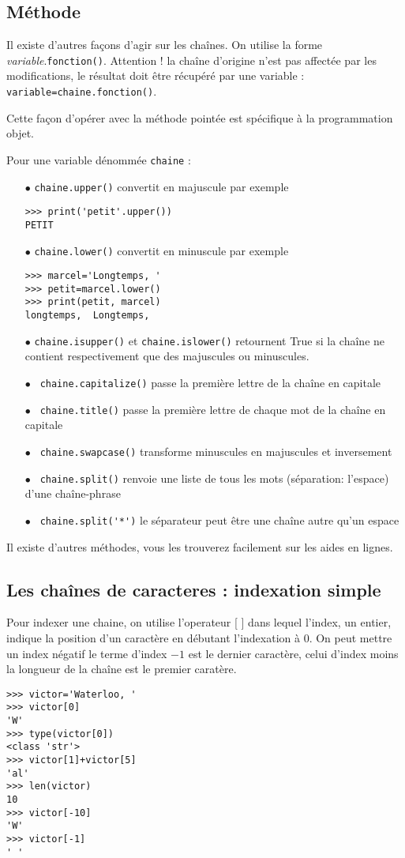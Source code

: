 \subsection{Méthode}
Il existe d'autres façons d'agir sur les chaînes. On  utilise la forme \emph{variable}.\lstinline?fonction()?. Attention ! la chaîne d'origine n'est pas affectée par les modifications, le résultat doit être récupéré par une variable : \lstinline?variable=chaine.fonction()?.\par
Cette façon d'opérer avec la méthode pointée est spécifique à la programmation objet.\par
 Pour une variable dénommée \lstinline?chaine? :
\begin{itemize}
	\item[$\bullet$] \lstinline?chaine.upper()? convertit en majuscule par exemple 
\begin{lstlisting}
>>> print('petit'.upper())
PETIT
\end{lstlisting}
	\item[$\bullet$] \lstinline?chaine.lower()? convertit en minuscule par exemple 
\begin{lstlisting}
>>> marcel='Longtemps, '
>>> petit=marcel.lower()
>>> print(petit, marcel)
longtemps,  Longtemps, \end{lstlisting}
\item[$\bullet$] {\tt  chaine.isupper()} et {\tt  chaine.islower()}  retournent True si la chaîne ne contient respectivement que des majuscules ou minuscules.
	\item[$\bullet$]\lstinline? chaine.capitalize()? passe la première lettre de la chaîne en capitale
	\item[$\bullet$]\lstinline? chaine.title()? passe la première lettre de chaque mot de la chaîne en capitale
	\item[$\bullet$]\lstinline? chaine.swapcase()? transforme minuscules en majuscules et inversement
	\item[$\bullet$]\lstinline? chaine.split()? renvoie une liste de tous les mots (séparation: l'espace) d'une chaîne-phrase
	\item[$\bullet$]\lstinline? chaine.split('*')? le séparateur peut être une chaîne autre qu'un espace
\end{itemize}
Il existe d'autres méthodes, vous les trouverez facilement sur les aides en lignes.
\subsection{Les chaînes de caracteres : indexation simple}
Pour indexer une chaine, on utilise l'operateur [ ] dans lequel l'index, un entier,  indique la position d'un caractère en débutant l'indexation à 0. On peut mettre un index négatif le terme d'index $-1$ est le dernier caractère, celui d'index moins la longueur de la chaîne est le premier caratère.
\begin{lstlisting}
>>> victor='Waterloo, '
>>> victor[0]
'W'
>>> type(victor[0])
<class 'str'>
>>> victor[1]+victor[5]
'al'
>>> len(victor)
10
>>> victor[-10]
'W'
>>> victor[-1]
' '
\end{lstlisting}
